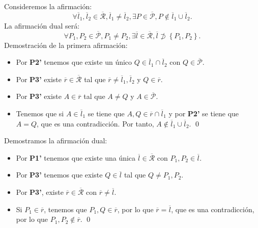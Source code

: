\begin{eg}
Consideremos la afirmación: 
\[ \forall \overline{l}_{1}, \overline{l}_{2} \in \overline{\mathcal{R}}, \overline{l}_{1} \neq \overline{l}_{2}, \exists P \in \overline{\mathcal{P}}, P \not\in \overline{l}_{1} \cup \overline{l}_{2}.\]
La afirmación dual será:
\[\forall P_{1}, P_{2} \in \overline{\mathcal{P}}, P_{1} \neq P_{2}, \exists \overline{l} \in \overline{\mathcal{R}}, \overline{l} \not\supset \left\{ P_{1}, P_{2}\right\}  .\]
Demostración de la primera afirmación: 
\begin{itemize}
\item Por \textbf{P2'} tenemos que existe un único $\displaystyle Q \in \overline{l}_{1} \cap \overline{l}_{2} $ con $\displaystyle Q \in \overline{\mathcal{P}} $.
\item Por \textbf{P3'} existe $\displaystyle \overline{r} \in \overline{\mathcal{R}} $ tal que $\displaystyle \overline{r} \neq \overline{l}_{1}, \overline{l}_{2} $ y $\displaystyle Q \in \overline{r} $.
\item Por \textbf{P3'} existe $\displaystyle A \in \overline{r} $ tal que $\displaystyle A \neq Q $ y $\displaystyle A \in \overline{\mathcal{P}} $.
\item Tenemos que si $\displaystyle A \in \overline{l}_{1} $ se tiene que $\displaystyle A,Q \in \overline{r} \cap \overline{l}_{1} $ y por \textbf{P2'} se tiene que $\displaystyle A = Q $, que es una contradicción. Por tanto, $\displaystyle A \not\in \overline{l}_{1} \cup \overline{l}_{2} $. \qed
\end{itemize}
Demostramos la afirmación dual: 
\begin{itemize}
\item Por \textbf{P1'} tenemos que existe una única $\displaystyle \overline{l} \in \overline{\mathcal{R}} $ con $\displaystyle P_{1}, P_{2 } \in \overline{l} $.
\item Por \textbf{P3'} tenemos que existe $\displaystyle Q \in \overline{l} $ tal que $\displaystyle Q \neq P_{1}, P_{2} $.
\item Por \textbf{P3'}, existe $\displaystyle \overline{r} \in \overline{\mathcal{R}} $ con $\displaystyle \overline{r} \neq \overline{l} $.
\item Si $\displaystyle P_{1} \in \overline{r} $, tenemos que $\displaystyle P_{1}, Q \in \overline{r} $, por lo que $\displaystyle \overline{r} = \overline{l} $, que es una contradicción, por lo que $\displaystyle P_{1}, P_{2} \not\in \overline{r} $. \qed
\end{itemize}
\end{eg}
